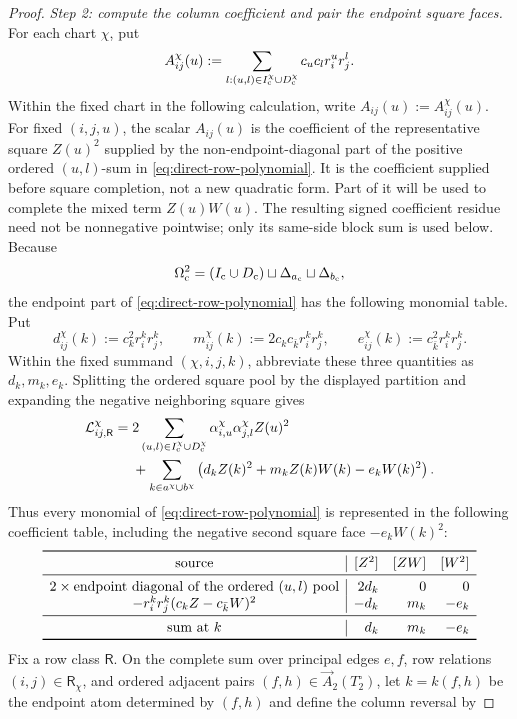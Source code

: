 \documentclass[11pt]{article}
\begin{document}
\begin{proof}
\emph{Step 2: compute the column coefficient and pair the endpoint square
faces.}
For each chart $\chi$, put
\[
 A_{ij}^{\chi}(u):=
 \sum_{l:(u,l)\in I_{\rm c}^\chi\cup D_{\rm c}^\chi}
 c_uc_l r_i^ur_j^l.
\]
Within the fixed chart in the following calculation, write
$A_{ij}(u):=A_{ij}^{\chi}(u)$.
For fixed $(i,j,u)$, the scalar $A_{ij}(u)$ is the coefficient of the
representative square $Z(u)^2$ supplied by the non-endpoint-diagonal part of
the positive ordered $(u,l)$-sum in \eqref{eq:direct-row-polynomial}.  It is
the coefficient supplied before square completion, not a new quadratic form.
Part of it will be used to complete the mixed term $Z(u)W(u)$.  The resulting
signed coefficient residue need not be nonnegative pointwise; only its
same-side block sum is used below.
Because
\[
 \Omega_{\rm c}^2=(I_{\rm c}\cup D_{\rm c})
 \sqcup\Delta_{a_{\rm c}}\sqcup\Delta_{b_{\rm c}},
\]
the endpoint part of \eqref{eq:direct-row-polynomial} has the following
monomial table.  Put
\[
 d_{ij}^{\chi}(k):=c_k^2r_i^kr_j^k,\qquad
 m_{ij}^{\chi}(k):=2c_kc_{\bar k}r_i^kr_j^k,\qquad
 e_{ij}^{\chi}(k):=c_{\bar k}^2r_i^kr_j^k.
\]
Within the fixed summand $(\chi,i,j,k)$, abbreviate these three quantities
as $d_k,m_k,e_k$.
Splitting the ordered square pool by the displayed partition and expanding
the negative neighboring square gives
\[
\begin{aligned}
\mathcal L_{ij,\mathsf R}^{\chi}
={}&
2\sum_{(u,l)\in I_{\rm c}^\chi\cup D_{\rm c}^\chi}
\alpha_{i,u}^{\chi}\alpha_{j,l}^{\chi}Z(u)^2\\
&+\sum_{k\in a^\chi\cup b^\chi}
\left(d_kZ(k)^2+m_kZ(k)W(k)-e_kW(k)^2\right).
\end{aligned}
\]
Thus every monomial of \eqref{eq:direct-row-polynomial} is represented in the
following coefficient table, including the negative second square face
$-e_kW(k)^2$:
\[
\begin{array}{c|rrr}
\toprule
\text{source}&[Z^2]&[ZW]&[W^2]\\
\midrule
2\times\text{endpoint diagonal of the ordered }(u,l)\text{ pool}
&2d_k&0&0\\
-r_i^kr_j^k(c_kZ-c_{\bar k}W)^2&-d_k&m_k&-e_k\\
\midrule
\text{sum at }k&d_k&m_k&-e_k\\
\bottomrule
\end{array}
\]
Fix a row class $\mathsf R$.  On the complete sum over principal edges
$e,f$, row relations $(i,j)\in\mathsf R_\chi$, and ordered adjacent pairs
$(f,h)\in\overrightarrow A_2(T_2^\circ)$, let $k=k(f,h)$ be the endpoint atom
determined by $(f,h)$ and define the column reversal by

\end{proof}
\end{document}
